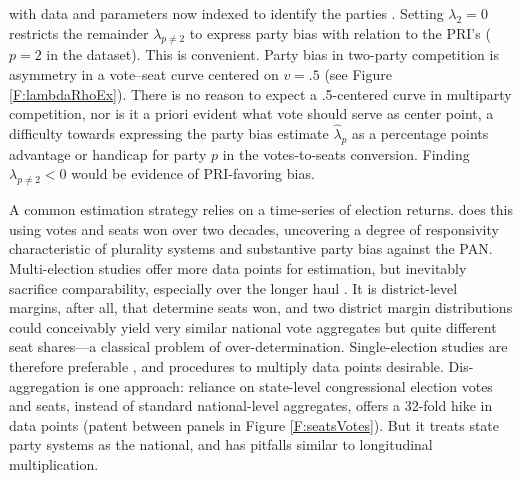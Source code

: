 \documentclass[letter,12pt]{article}
\begin{document}
\noindent with data and parameters now indexed to identify the parties \citep[another is][]{calvo.micozzi.govReform.2005}. Setting $\lambda_2 = 0$ restricts the remainder $\lambda_{p \neq 2}$ to express party bias with relation to the PRI's ($p=2$ in the dataset). This is convenient. Party bias in two-party competition is asymmetry in a vote--seat curve centered on $v=.5$ (see Figure \ref{F:lambdaRhoEx}). There is no reason to expect a .5-centered curve in multiparty competition, nor is it a priori evident what vote should serve as center point, a difficulty towards expressing the party bias estimate $\hat{\lambda}_p$ as a percentage points advantage or handicap for party $p$ in the votes-to-seats conversion. Finding $\lambda_{p \neq 2}<0$ would be evidence of PRI-favoring bias. %

A common estimation strategy relies on a time-series of election returns. \citet{marquez2014biasBlog} does this using votes and seats won over two decades, uncovering a degree of responsivity characteristic of plurality systems and substantive party bias against the PAN. Multi-election studies offer more data points for estimation, but inevitably sacrifice comparability, especially over the longer haul \citep{jackmanMeasuringBias1994}. It is district-level margins, after all, that determine seats won, and two district margin distributions could conceivably yield very similar national vote aggregates but quite different seat shares---a classical problem of over-determination. Single-election studies are therefore preferable \citep{niemi.fett1986swing}, and procedures to multiply data points desirable. Dis-aggregation is one approach: reliance on state-level congressional election votes and seats, instead of standard national-level aggregates, offers a 32-fold hike in data points (patent between panels in Figure \ref{F:seatsVotes}). But it treats state party systems as the national, and has pitfalls similar to longitudinal multiplication. %
\end{document}
